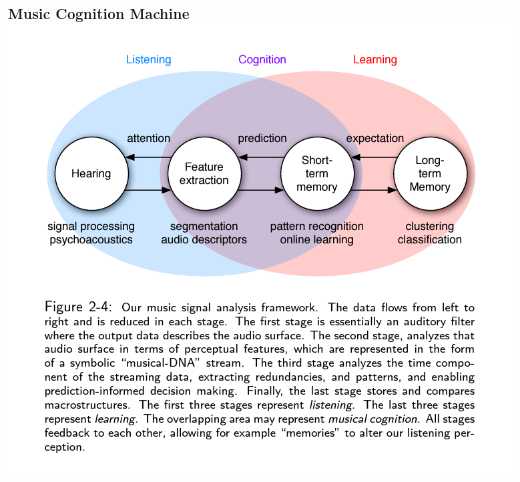 \documentclass[11pt]{article}
\makeatletter
\def\maxwidth{\ifdim\Gin@nat@width>\linewidth\linewidth
    \else\Gin@nat@width\fi}
\let\Oldincludegraphics\includegraphics
\renewcommand{\includegraphics}[1]{\Oldincludegraphics[width=.8\maxwidth]{#1}}
\makeatother
\begin{document}
    \textbf{Music Cognition Machine} \includegraphics{fig_14.PNG}


    
    
    
    
\end{document}
